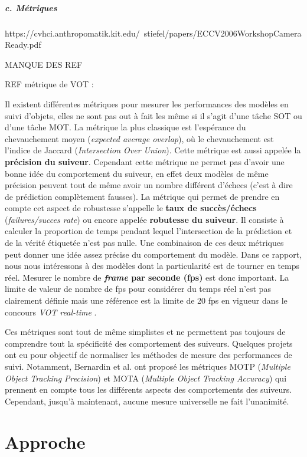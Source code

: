 \documentclass[10pt,twocolumn,letterpaper,french]{article}
\begin{document}
\subparagraph{c. Métriques}

https://cvhci.anthropomatik.kit.edu/~stiefel/papers/ECCV2006WorkshopCameraReady.pdf

MANQUE DES REF

REF métrique de VOT : \cite{Kristan_2016}

Il existent différentes métriques pour mesurer les performances des modèles en suivi d'objets, elles ne sont pas out à fait les même si il s'agit d'une tâche SOT ou d'une tâche MOT. La métrique la plus classique est l'espérance du chevauchement moyen (\textit{expected average overlap}), où le chevauchement est l'indice de Jaccard (\textit{Intersection Over Union}). Cette métrique est aussi appelée la \textbf{précision du suiveur}. Cependant cette métrique ne permet pas d'avoir une bonne idée du comportement du suiveur, en effet deux modèles de même précision peuvent tout de même avoir un nombre différent d'échecs (c'est à dire de prédiction complètement fausses). La métrique qui permet de prendre en compte cet aspect de robustesse s'appelle le \textbf{taux de succès/échecs} (\textit{failures/succes rate}) ou encore appelée \textbf{robutesse du suiveur}. Il consiste à calculer la proportion de temps pendant lequel l'intersection de la prédiction et de la vérité étiquetée n'est pas nulle. Une combinaison de ces deux métriques peut donner une idée assez précise du comportement du modèle.
Dans ce rapport, nous nous intéressons à des modèles dont la particularité est de tourner en temps réel. Mesurer le nombre de \textbf{\textit{frame} par seconde (fps)} est donc important. La limite de valeur de nombre de fps pour considérer du temps réel n'est pas clairement définie mais une référence est la limite de 20 fps en vigueur dans le concours \textit {VOT real-time} \cite{VOT}.

Ces métriques sont tout de même simplistes et ne permettent pas toujours de comprendre tout la spécificité des comportement des suiveurs. Quelques projets ont eu pour objectif de normaliser les méthodes de mesure des performances de suivi. Notamment, Bernardin et al. \cite{metrics} ont proposé les métriques MOTP (\textit{Multiple Object Tracking Precision}) et MOTA (\textit{Multiple Object Tracking Accuracy}) qui prennent en compte tous les différents aspects des comportements des suiveurs. Cependant, jusqu'à maintenant, aucune mesure universelle ne fait l'unanimité. 

\section*{Approche}
\end{document}
